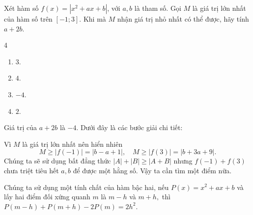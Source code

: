 \begin{baitap}
	Xét hàm số $f(x) = |x^2 + ax + b|$, với $a, b$ là tham số. Gọi $M$ là giá trị lớn nhất của hàm số trên $[-1; 3]$. Khi mà $M$ nhận giá trị nhỏ nhất có thể được, hãy tính $a + 2b$.
	\begin{multicols}{4}
		\begin{enumerate}
			\item $3$.
			\item $4$.
			\item $-4$.
			\item $2$.
		\end{enumerate}
	\end{multicols}
	\begin{traloi}
		 Giá trị của $a + 2b$ là $-4$. Dưới đây là các bước giải chi tiết:
		
		Vì $ M $ là giá trị lớn nhất nên hiển nhiên $$ M \ge |f(-1)| = |b - a + 1|,\quad M \ge |f(3)| = |b + 3a + 9| .$$
		Chúng ta sẽ sử dụng bất đẳng thức $|A| + |B| \ge |A+B|$ nhưng $ f(-1)+f(3) $ chưa triệt tiêu hết $ a,b $ để được một hằng số. Vậy ta cần tìm một điểm nữa. 
		
		Chúng ta sử dụng một tính chất của hàm bậc hai, nếu $ P(x)=x^2+ax+b$ và lấy hai điểm đối xứng quanh \(m\) là $
		m-h$ và $ m+h, $ thì $ P(m-h)+P(m+h)-2P(m)=2h^2. $
		

\end{traloi}
\end{baitap}
